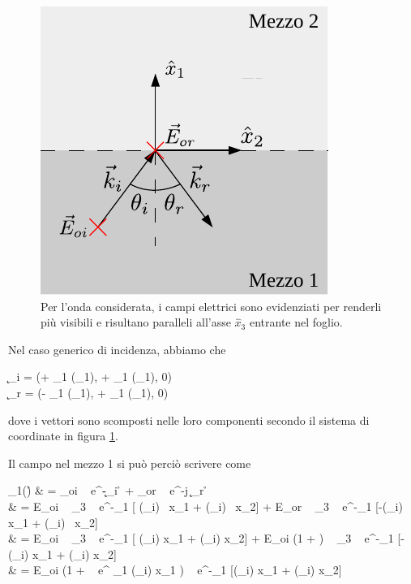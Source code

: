 	\begin{figure}[ht]
		\centering
		\includegraphics{img/campi_incidenza_non_normale.pdf}
		 \caption{Per l'onda considerata, i campi elettrici sono evidenziati per renderli più visibili e risultano paralleli all'asse $\hat{x}_3$ entrante nel foglio.}
		\label{fig:campi_incidenza_non_normale_isolanti}
	\end{figure}

	Nel caso generico di incidenza, abbiamo che
	\begin{esp}
		\begin{cases}
			\k_i = (+ \beta_1 \cos(\theta_1), + \beta_1 \sin(\theta_1), 0) \\
			\k_r = (- \beta_1 \cos(\theta_1), + \beta_1 \sin(\theta_1), 0)
		\end{cases}
	\end{esp}
	dove i vettori sono scomposti nelle loro componenti secondo il sistema di coordinate in figura \ref{fig:campi_incidenza_non_normale_isolanti}.

	Il campo nel mezzo 1 si può perciò scrivere come
	\begin{esp}
		\E_1(\r)
		& = \E_{oi} ~ e^{-\jmath \k_i \cdot \r} + \E_{or} ~ e^{-j \k_r \cdot \r} \\
		& = E_{oi} ~ \hat{x}_3
			~ e^{-\jmath \beta_1 [ \cos(\theta_i) \, x_1 + \sin(\theta_i) \, x_2] }
			+ E_{or} ~ \hat{x}_3
			~ e^{-\jmath \beta_1 [-\cos(\theta_i) \, x_1 + \sin(\theta_i) \, x_2] } \\
		& = E_{oi} ~ \hat{x}_3
			~ e^{-\jmath \beta_1 [ \cos(\theta_i) x_1 + \sin(\theta_i) x_2] }
			+ E_{oi} (1 + \rho)
			~ _3 ~ e^{-\jmath \beta_1 [-\cos(\theta_i) x_1 + \sin(\theta_i) x_2]} \\
		& = E_{oi} (1 + \rho ~ e^{ \beta_1 \cos(\theta_i) x_1} )
			~ e^{-\jmath \beta_1 [\cos(\theta_i) x_1 + \sin(\theta_i) x_2]} \\
	\end{esp}

